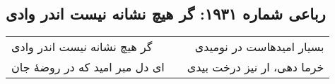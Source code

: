 \begin{center}
\section*{رباعی شماره ۱۹۳۱: گر هیچ نشانه نیست اندر وادی}
\label{sec:1931}
\begin{longtable}{l p{0.5cm} r}
گر هیچ نشانه نیست اندر وادی
&&
بسیار امیدهاست در نومیدی
\\
ای دل مبر امید که در روضهٔ جان
&&
خرما دهی، ار نیز درخت بیدی
\\
\end{longtable}
\end{center}
